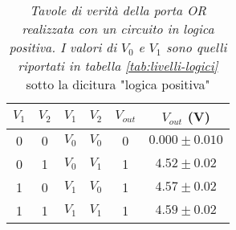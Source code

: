 \begin{table}[H]
  \centering
  \begin{tabular}[t]{c  c | c  c | c  c}
    \hline
    $V_{1}$ & $V_{2}$ & $V_{1}$ & $V_{2}$ & $V_{out}$ & $V_{out}$ (V) \\
    \hline
    0 & 0 & $V_{0}$ & $V_{0}$ & 0 & $0.000 \pm 0.010$ \\
    0 & 1 & $V_{0}$ & $V_{1}$ & 1 & $4.52 \pm 0.02$ \\
    1 & 0 & $V_{1}$ & $V_{0}$ & 1 & $4.57 \pm 0.02$ \\
    1 & 1 & $V_{1}$ & $V_{1}$ & 1 & $4.59 \pm 0.02$ \\
    \hline
  \end{tabular}
  \caption{\emph{Tavole di verità della porta \emph{OR} realizzata con un circuito in logica positiva. I valori di $V_{0}$ e $V_{1}$ sono quelli riportati in tabella \ref{tab:livelli-logici}} sotto la dicitura "logica positiva"}
  \label{tab:or-logicapositiva}
\end{table}